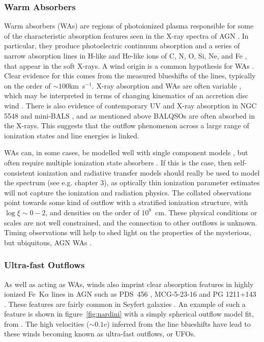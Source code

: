 \subsubsection{Warm Absorbers}

Warm absorbers (WAs) are regions of photoionized plasma responsible for some
of the characteristic absorption features seen in the 
X-ray spectra of AGN \citep{reynolds1995}.
In particular, they produce photoelectric continuum absorption 
\citep[e.g.][]{halpern1984,cappi1996,kriss1996}
and a series of narrow absorption lines in H-like and He-like ions of 
C, N, O, Si, Ne, and Fe \citep{kaastra2000}, that appear in the soft X-rays.
A wind origin is a common hypothesis for WAs 
\citep[e.g.][]{krolikkriss2001}. Clear evidence for this 
comes from the measured blueshifts of the lines, typically on the order of 
$\sim100$km~s$^{-1}$. X-ray absorption and WAs are often
variable \citep{fabian1994,otani1996}, which may be interpreted in terms of 
changing kinematics of an accretion disc wind \citep{connolly2014}. 
There is also evidence of contemporary UV and X-ray absorption 
in NGC 5548 \citep{kaastra2014} and mini-BALS \citep{giustini2011},
and as mentioned above BALQSOs 
are often absorbed in the X-rays. This suggests that the outflow phenomenon 
across a large range of ionization states and line energies is linked. 

WAs can, in some cases, be modelled well with single component 
models \citep{kaastra2000}, but often
require multiple ionization state absorbers 
\citep[e.g.][]{kriss1996,orr1997,krolikkriss2001,connolly2014}.
If this is the case, then self-consistent ionization and radiative transfer models
should really be used to model the spectrum (see e.g. chapter 3), 
as optically thin ionization parameter estimates will not capture 
the ionization and radiation physics.
The collated observations point towards some kind of outflow with a stratified ionization
structure, with $\log \xi \sim 0-2$, and densities on the order of $10^8$~cm. 
These physical conditions or scales are not well constrained, and the connection to 
other outflows is unknown. Timing observations will help to shed light on 
the properties of the mysterious, but ubiquitous, 
AGN WAs \citep{silva2015}.

\subsubsection{Ultra-fast Outflows}

As well as acting as WAs, winds also imprint clear absorption features
in highly ionized Fe~K$\alpha$ lines in AGN such as PDS~456 
\citep{reeves2003, gofford2014,matzeu2016},
MCG-5-23-16 \citep{braito2007} and PG 1211+143 \citep{poundsreeves2009,fukumura2015}.
These features are fairly common in Seyfert galaxies \citep{tombesi2010a, gofford2013}. 
An example of such a feature is shown in 
figure~\ref{fig:nardini} with a simply spherical outflow model fit, 
from \citep{nardini2015}. The high velocities ($\sim0.1c$) inferred 
from the line blueshifts have lead to these winds becoming known as 
ultra-fast outflows, or UFOs. 

